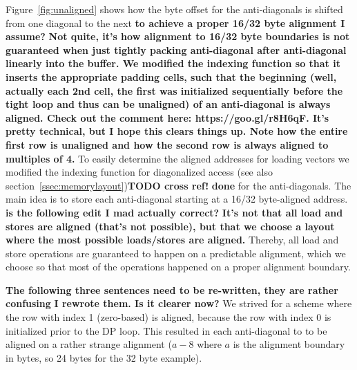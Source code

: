 \documentclass[runningheads,a4paper]{llncs}
\begin{document}
Figure~\ref{fig:unaligned} shows how the byte offset for the anti-diagonals is shifted from one diagonal to the next {\bf to achieve a proper 16/32 byte alignment I assume?} {\bf Not quite, it's how alignment to 16/32 byte boundaries is not guaranteed when just tightly packing anti-diagonal after anti-diagonal linearly into the buffer. We modified the indexing function so that it inserts the appropriate padding cells, such that the beginning (well, actually each 2nd cell, the first was initialized sequentially before the tight loop and thus can be unaligned) of an anti-diagonal is always aligned. Check out the comment here: https://goo.gl/r8H6qF. It's pretty technical, but I hope this clears things up. Note how the entire first row is unaligned and how the second row is always aligned to multiples of 4.}
To easily determine the aligned addresses for loading vectors we modified the indexing function for diagonalized access (see also section~\ref{ssec:memorylayout}){\bf TODO cross ref!} {\bf done} for the anti-diagonals. 
The main idea is to store each anti-diagonal starting at a 16/32 byte-aligned address. {\bf is the following edit I mad actually correct?} {\bf It's not that all load and stores are aligned (that's not possible), but that we choose a layout where the most possible loads/stores are aligned. } Thereby, all load and store operations are guaranteed to happen on a predictable alignment, which we choose so that most of the operations happened on a proper alignment boundary.

{\bf The following three sentences need to be re-written, they are rather confusing}  
{\bf I rewrote them. Is it clearer now?}
We strived for a scheme where the row with index 1 (zero-based) is aligned, because the row with index 0 is initialized prior to the DP loop. This resulted in each anti-diagonal to to be aligned on a rather strange alignment ($a - 8$ where $a$ is the alignment boundary in bytes, so 24 bytes for the 32 byte example). 

\end{document}
